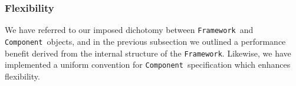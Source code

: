 \documentclass[5p,aas_macros]{elsarticle}
\newcommand{\framework}{\texttt{Framework}}
\newcommand{\component}{\texttt{Component}}
\begin{document}






\subsubsection{Flexibility}
\label{sec:halomod:overview:flexibility}
We have referred to our imposed dichotomy between \framework\ and \component\ objects, and in the previous subsection we outlined a performance benefit derived from the internal structure of the \framework. Likewise, we have implemented a uniform convention for \component\ specification which enhances flexibility.
\end{document}
